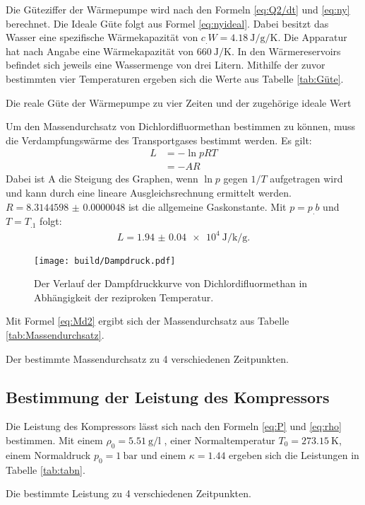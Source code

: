 Die Güteziffer der Wärmepumpe wird nach den Formeln \eqref{eq:Q2/dt} und \eqref{eq:ny} berechnet. Die Ideale Güte folgt aus Formel \eqref{eq:nyideal}. 
Dabei besitzt das Wasser eine spezifische Wärmekapazität von $c_.W=\SI{4.18}{\joule\per\gram\per\kelvin}$. Die Apparatur hat nach Angabe eine Wärmekapazität von $\SI{660}{\joule\per\kelvin}$\cite{V206}. In den Wärmereservoirs befindet sich jeweils eine Wassermenge von drei Litern. Mithilfe der zuvor bestimmten vier Temperaturen ergeben sich die Werte aus Tabelle \ref{tab:Güte}. 
\begin{table}
	\centering
	\caption{Die reale Güte der Wärmepumpe zu vier Zeiten und der zugehörige ideale Wert}
 	\label{tab:Güte}
\end{table}
\newline
\noindent Um den Massendurchsatz von Dichlordifluormethan bestimmen zu können, muss die Verdampfungswärme des Transportgases bestimmt werden. Es gilt:
\begin{align*}
 	 L &= -\ln{p} RT\\
	    &= - A R
\end{align*}
Dabei ist A die Steigung des Graphen, wenn $\ln{p}$ gegen $1/T$ aufgetragen wird und kann durch eine lineare Ausgleichsrechnung ermittelt werden. $R = \num{8.3144598(48)}$ \cite{R} ist die allgemeine Gaskonstante.
Mit $p=p_.b$ und $T=T_.1$ folgt:
\begin{align*}
 	 L = \SI{1.94(4)e+4}{\joule\per\kilo\per\gram}\text{.}
\end{align*}
\begin{figure}
 	\centering
 	\caption{Der Verlauf der Dampfdruckkurve von Dichlordifluormethan in Abhängigkeit der reziproken Temperatur.}
 	\texttt{[image: build/Dampdruck.pdf]}
 	\label{fig:Dampfdruck}
\end{figure}
\newline
\noindent Mit Formel \eqref{eq:Md2} ergibt sich der Massendurchsatz aus Tabelle \ref{tab:Massendurchsatz}.
 \begin{table}
   	\centering
   	\caption{Der bestimmte Massendurchsatz zu 4 verschiedenen Zeitpunkten.}
   	\label{tab:Massendurchsatz}
 \end{table}

\subsection{Bestimmung der Leistung des Kompressors}

Die Leistung des Kompressors lässt sich nach den Formeln \eqref{eq:P} und \eqref{eq:rho} bestimmen. Mit einem $\rho_0 = \SI{5.51}{\gram\per\litre}$ \cite{V206}, einer Normaltemperatur $T_0 = \SI{273.15}{\kelvin}$,  einem Normaldruck $p_0 = \SI{1}{\bar}$ und einem $\kappa = 1.44$ \cite{V206} ergeben sich die Leistungen in Tabelle \ref{tab:tabn}.

 \begin{table}
  \centering
  \caption{Die bestimmte Leistung zu 4 verschiedenen Zeitpunkten.}
  \label{tab:Leistung}
\end{table}
